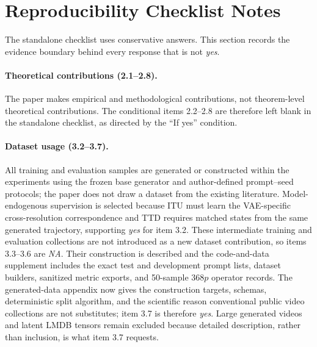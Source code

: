 \documentclass[letterpaper]{article}
\begin{document}
\section{Reproducibility Checklist Notes}

The standalone checklist uses conservative answers.  This section records the
evidence boundary behind every response that is not \emph{yes}.

\paragraph{Theoretical contributions (2.1--2.8).}
The paper makes empirical and methodological contributions, not theorem-level
theoretical contributions.  The conditional items 2.2--2.8 are therefore left
blank in the standalone checklist, as directed by the ``If yes'' condition.

\paragraph{Dataset usage (3.2--3.7).}
All training and evaluation samples are generated or constructed within the
experiments using the frozen base generator and author-defined prompt--seed
protocols; the paper does not draw a dataset from the existing literature.
Model-endogenous supervision is selected because ITU must learn the
VAE-specific cross-resolution correspondence and TTD requires matched states
from the same generated trajectory, supporting \emph{yes} for item 3.2.
These intermediate training and evaluation collections are not introduced as
a new dataset contribution, so items 3.3--3.6 are \emph{NA}.  Their
construction is described and the code-and-data supplement includes the exact
test and development prompt lists, dataset builders, sanitized metric exports,
and 50-sample \(368p\) operator records.  The generated-data appendix now gives
the construction targets, schemas, deterministic split algorithm, and the
scientific reason conventional public video collections are not substitutes;
item 3.7 is therefore \emph{yes}.  Large generated videos and latent LMDB
tensors remain excluded because detailed description, rather than inclusion,
is what item 3.7 requests.
\end{document}
